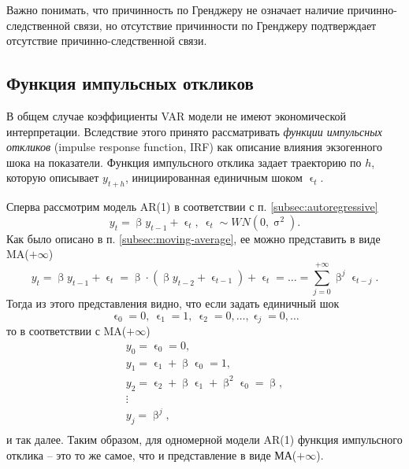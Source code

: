 \documentclass[a4paper, 14pt]{extreport}
\numberwithin{equation}{section}
\renewcommand{\beta}{\upbeta}
\renewcommand{\epsilon}{\upvarepsilon}
\renewcommand{\sigma}{\upsigma}
\numberwithin{equation}{section}
\begin{document}
	Важно понимать, что причинность по Гренджеру не означает наличие причинно-следственной связи, но отсутствие причинности по Гренджеру подтверждает отсутствие причинно-следственной связи.
	
	\subsection{Функция импульсных откликов}
	\label{subsec:irf}
	
	В общем случае коэффициенты VAR модели не имеют экономической интерпретации. Вследствие этого принято рассматривать \textit{функции импульсных откликов} (impulse response function, IRF) как описание влияния экзогенного шока на показатели.
	Функция импульсного отклика задает траекторию по $h$, которую описывает $y_{t+h}$, инициированная единичным шоком $\epsilon_{t}$.
	
	Сперва рассмотрим модель AR(1) в соответствии с п. \ref{subsec:autoregressive}
	\begin{equation}
		y_t = \beta y_{t-1} + \epsilon_t,\ \epsilon_t \sim WN(0,\sigma^2).
	\end{equation}
	Как было описано в п. \ref{subsec:moving-average}, ее можно представить в виде MA($+\infty$)
	\begin{equation*}
		y_t = \beta y_{t-1} + \epsilon_t = \beta\cdot (\beta y_{t-2} + \epsilon_{t-1}) + \epsilon _t = \ldots = \sum_{j=0}^{+\infty} \beta^j \epsilon_{t-j}.
	\end{equation*}
	Тогда из этого представления видно, что если задать единичный шок
	\begin{equation*}
		\epsilon_0 = 0,\ \epsilon_1 = 1,\ \epsilon_2 = 0,\ldots, \epsilon_j = 0,\ldots
	\end{equation*} 
	то в соответствии с MA($+\infty$)
	\begin{equation*}
		\begin{gathered}
			y_0 = \epsilon_0 = 0,\\
			y_1 = \epsilon_1 + \beta\epsilon_0 = 1,\\
			y_2 = \epsilon_2 + \beta \epsilon_1 + \beta^2 \epsilon_0 = \beta,\\
			\vdots\\
			y_j = \beta^j,\\
		\end{gathered}
	\end{equation*}
	и так далее. Таким образом, для одномерной модели AR(1) функция импульсного отклика -- это то же самое, что и представление в виде МА($+\infty$).
	
\end{document}
